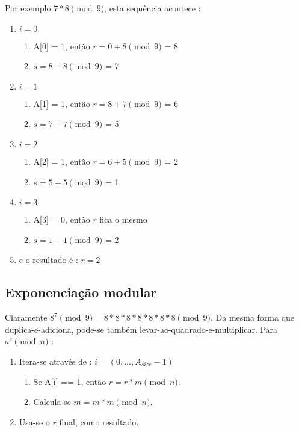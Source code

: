 Por exemplo $7*8 \pmod 9$, esta sequência acontece :
\begin{enumerate}
	\item $i = 0$
	\begin{enumerate}
		\item A[0] = 1, então $r = 0 + 8 \pmod 9$ = 8
		\item $s = 8 + 8 \pmod 9$ = 7
	\end{enumerate}
	\item $i = 1$
	\begin{enumerate}
		\item A[1] = 1, então $r = 8 + 7 \pmod 9$ = 6
		\item $s = 7 + 7 \pmod 9$ = 5
	\end{enumerate}
	\item $i = 2$
	\begin{enumerate}
		\item A[2] = 1, então $r = 6 + 5 \pmod 9$ = 2
		\item $s = 5 + 5 \pmod 9$ = 1
	\end{enumerate}
	\item $i = 3$
	\begin{enumerate}
		\item A[3] = 0, então $r$ fica o mesmo
		\item $s = 1 + 1 \pmod 9$ = 2
	\end{enumerate}
	\item e o resultado é : $r = 2$
\end{enumerate}


\subsection{Exponenciação modular}

Claramente $8^7 \pmod 9 = 8*8*8*8*8*8*8 \pmod 9$. Da mesma forma que duplica-e-adiciona, pode-se também levar-ao-quadrado-e-multiplicar. Para $a^e \pmod{n}$ :
\begin{enumerate}
	\item Itera-se através de : $i = (0,...,A_{size} - 1)$
	\begin{enumerate}
		\item Se A[i] == 1, então $r = r * m \pmod n$.
		\item Calcula-se $m = m * m \pmod n$.
	\end{enumerate}
	\item Usa-se o $r$ final, como resultado.
\end{enumerate}


